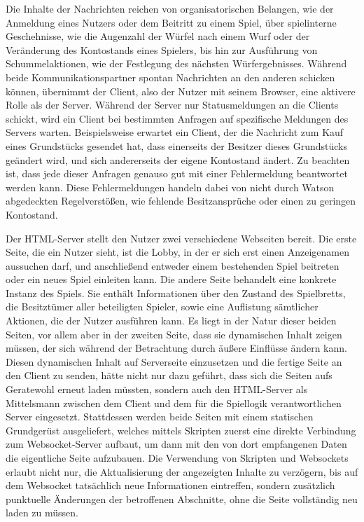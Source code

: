 \documentclass[german]{cgspaper} %
\begin{document}
Die Inhalte der Nachrichten reichen von organisatorischen Belangen, wie der Anmeldung eines Nutzers oder dem Beitritt zu einem Spiel, über spielinterne Geschehnisse, wie die Augenzahl der Würfel nach einem Wurf oder der Veränderung des Kontostands eines Spielers, bis hin zur Ausführung von Schummelaktionen, wie der Festlegung des nächsten Würfergebnisses.
Während beide Kommunikationspartner spontan Nachrichten an den anderen schicken können, übernimmt der Client, also der Nutzer mit seinem Browser, eine aktivere Rolle als der Server.
Während der Server nur Statusmeldungen an die Clients schickt, wird ein Client bei bestimmten Anfragen auf spezifische Meldungen des Servers warten. Beispielsweise erwartet ein Client, der die Nachricht zum Kauf eines Grundstücks gesendet hat, dass einerseits der Besitzer dieses Grundstücks geändert wird, und sich andererseits der eigene Kontostand ändert.
Zu beachten ist, dass jede dieser Anfragen genauso gut mit einer Fehlermeldung beantwortet werden kann. Diese Fehlermeldungen handeln dabei von nicht durch Watson abgedeckten Regelverstößen, wie fehlende Besitzansprüche oder einen zu geringen Kontostand.

Der HTML-Server stellt den Nutzer zwei verschiedene Webseiten bereit.
Die erste Seite, die ein Nutzer sieht, ist die Lobby, in der er sich erst einen Anzeigenamen aussuchen darf, und anschließend entweder einem bestehenden Spiel beitreten oder ein neues Spiel einleiten kann.
Die andere Seite behandelt eine konkrete Instanz des Spiels. Sie enthält Informationen über den Zustand des Spielbretts, die Besitztümer aller beteiligten Spieler, sowie eine Auflistung sämtlicher Aktionen, die der Nutzer ausführen kann.
Es liegt in der Natur dieser beiden Seiten, vor allem aber in der zweiten Seite, dass sie dynamischen Inhalt zeigen müssen, der sich während der Betrachtung durch äußere Einflüsse ändern kann.
Diesen dynamischen Inhalt auf Serverseite einzusetzen und die fertige Seite an den Client zu senden, hätte nicht nur dazu geführt, dass sich die Seiten aufs Geratewohl erneut laden müssten, sondern auch den HTML-Server als Mittelsmann zwischen dem Client und dem für die Spiellogik verantwortlichen Server eingesetzt.
Stattdessen werden beide Seiten mit einem statischen Grundgerüst ausgeliefert, welches mittels Skripten zuerst eine direkte Verbindung zum Websocket-Server aufbaut, um dann mit den von dort empfangenen Daten die eigentliche Seite aufzubauen.
Die Verwendung von Skripten und Websockets erlaubt nicht nur, die Aktualisierung der angezeigten Inhalte zu verzögern, bis auf dem Websocket tatsächlich neue Informationen eintreffen, sondern zusätzlich punktuelle Änderungen der betroffenen Abschnitte, ohne die Seite vollständig neu laden zu müssen.
\end{document}
